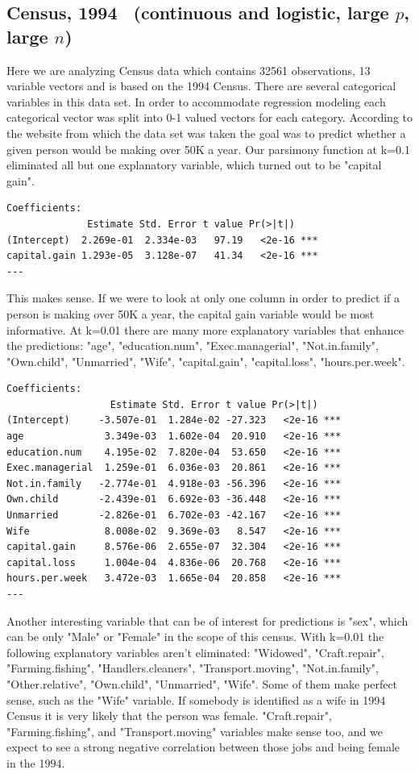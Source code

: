 \documentclass[letter]{article}
\begin{document}
\subsection*{Census, 1994~\cite{census} (continuous and logistic, large $p$, large $n$)}
Here we are analyzing Census data which contains 32561 observations, 13 variable vectors and is based on the 1994 Census. There are several categorical variables in this data set. In order to accommodate regression modeling each categorical vector was split into 0-1 valued vectors for each category. According to the website from which the data set was taken the goal was to predict whether a given person would be making over 50K a year.  Our parsimony function at k=0.1 eliminated all but one explanatory variable, which turned out to be "capital gain". 
\begin{verbatim}
Coefficients:
              Estimate Std. Error t value Pr(>|t|)    
(Intercept)  2.269e-01  2.334e-03   97.19   <2e-16 ***
capital.gain 1.293e-05  3.128e-07   41.34   <2e-16 ***
---

\end{verbatim}

This makes sense. If we were to look at only one column in order to predict if a person is making over 50K a year, the capital gain variable would be most informative. At k=0.01 there are many more explanatory variables that enhance the predictions:  "age", "education.num", "Exec.managerial", "Not.in.family", "Own.child", "Unmarried", "Wife", "capital.gain", "capital.loss", "hours.per.week".

\begin{verbatim}
Coefficients:
                  Estimate Std. Error t value Pr(>|t|)    
(Intercept)     -3.507e-01  1.284e-02 -27.323   <2e-16 ***
age              3.349e-03  1.602e-04  20.910   <2e-16 ***
education.num    4.195e-02  7.820e-04  53.650   <2e-16 ***
Exec.managerial  1.259e-01  6.036e-03  20.861   <2e-16 ***
Not.in.family   -2.774e-01  4.918e-03 -56.396   <2e-16 ***
Own.child       -2.439e-01  6.692e-03 -36.448   <2e-16 ***
Unmarried       -2.826e-01  6.702e-03 -42.167   <2e-16 ***
Wife             8.008e-02  9.369e-03   8.547   <2e-16 ***
capital.gain     8.576e-06  2.655e-07  32.304   <2e-16 ***
capital.loss     1.004e-04  4.836e-06  20.768   <2e-16 ***
hours.per.week   3.472e-03  1.665e-04  20.858   <2e-16 ***
---
\end{verbatim}

Another interesting variable that can be of interest for predictions is "sex", which can be only "Male" or "Female" in the scope of this census. With k=0.01 the following explanatory variables aren't eliminated: "Widowed", "Craft.repair", "Farming.fishing", "Handlers.cleaners", "Transport.moving", "Not.in.family", "Other.relative", "Own.child", "Unmarried", "Wife". Some of them make perfect sense, such as the "Wife" variable. If somebody is identified as a wife in 1994 Census it is very likely that the person was female. "Craft.repair", "Farming.fishing", and  "Transport.moving" variables make sense too, and we expect to see a strong negative correlation between those jobs and being female in the 1994.
\end{document}
